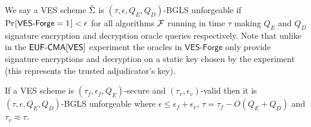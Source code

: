 \begin{definition}
\label{original-unforgeability}

We say a VES scheme $\hat{\Sigma}$ is $(\tau, \epsilon, Q_E, Q_D)$-BGLS unforgeable if $\prob{\textsf{VES-Forge} = 1} < \epsilon$ for all algorithms $\mathcal{F}$ running in time $\tau$ making $Q_E$ and $Q_D$ signature encryption and decryption oracle queries respectively.
Note that unlike in the $\textsf{EUF-CMA}[\textsf{VES}]$ experiment the oracles in $\textsf{VES-Forge}$ only provide signature encryptions and decryption on a static key chosen by the experiment (this represents the trusted adjudicator's key).

 \begin{center}
 \end{center}


\end{definition}

\begin{theorem}
If a VES scheme is $(\tau_f, \epsilon_f, Q_E)$-\EUFCMAVES secure and $(\tau_v, \epsilon_v)$-valid then it is $(\tau, \epsilon, Q_E, Q_D)$-BGLS unforgeable where $\epsilon \leq \epsilon_f + \epsilon_v$, $\tau = \tau_f - O(Q_E + Q_D)$ and $\tau_v \approx \tau$.
\end{theorem}

